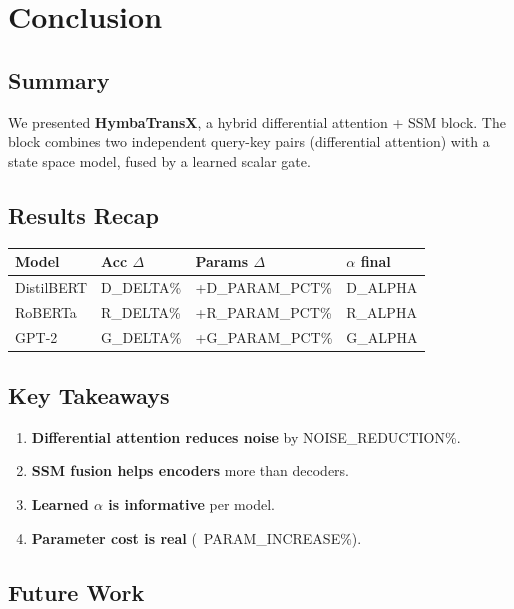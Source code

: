 \section{Conclusion}

\subsection{Summary}

We presented \textbf{HymbaTransX}, a hybrid differential attention + SSM block. 
The block combines two independent query-key pairs (differential attention) 
with a state space model, fused by a learned scalar gate.

\subsection{Results Recap}

\begin{table}[H]
\centering
\small
\begin{tabular}{llll}
\toprule
\textbf{Model} & \textbf{Acc $\Delta$} & \textbf{Params $\Delta$} & \textbf{$\alpha$ final} \\
\midrule
DistilBERT & {{D\_DELTA}}\% & +{{D\_PARAM\_PCT}}\% & {{D\_ALPHA}} \\
RoBERTa & {{R\_DELTA}}\% & +{{R\_PARAM\_PCT}}\% & {{R\_ALPHA}} \\
GPT-2 & {{G\_DELTA}}\% & +{{G\_PARAM\_PCT}}\% & {{G\_ALPHA}} \\
\bottomrule
\end{tabular}
\end{table}

\subsection{Key Takeaways}

\begin{enumerate}
\item \textbf{Differential attention reduces noise} by {{NOISE\_REDUCTION}}\%.
\item \textbf{SSM fusion helps encoders} more than decoders.
\item \textbf{Learned $\alpha$ is informative} per model.
\item \textbf{Parameter cost is real} (~{{PARAM\_INCREASE}}\%).

\end{enumerate}
\subsection{Future Work}


